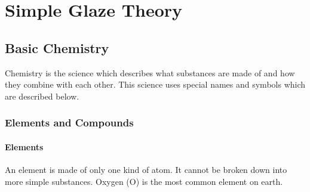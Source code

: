 \chapter{Simple Glaze Theory}
\section{Basic Chemistry}
Chemistry is the science which describes what substances are made of and how 
they combine with each other. This science uses special names and symbols which 
are described below.
\subsection{Elements and Compounds}
\subsubsection{Elements}
An element is made of only one kind of atom. It cannot be broken down into more 
simple substances. Oxygen (O) is the most common element on earth.
